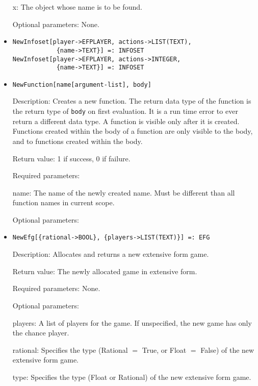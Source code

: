 \begin{itemize}
\bd
\item
[x:] The object whose name is to be found.
\ed

\item
[Optional parameters:] None.
\ed


\item
\protect \large \begin{verbatim} 
NewInfoset[player->EFPLAYER, actions->LIST(TEXT),
            {name->TEXT}] =: INFOSET
NewInfoset[player->EFPLAYER, actions->INTEGER,
            {name->TEXT}] =: INFOSET
\end{verbatim}\normalsize


\item   
\protect \large \begin{verbatim}
NewFunction[name[argument-list], body]
\end{verbatim}\normalsize

\bd
\item
[Description:] Creates a new function.  The return data type of the
function is the return type of \verb+body+ on first evaluation.  It is
a run time error to ever return a different data type.  A function is
visible only after it is created.  Functions created within the body
of a function are only visible to the body, and to functions created
within the body.
\item
[Return value:] 1 if success, 0 if failure.  
\item
[Required parameters:]
\bd
\item[name:] The name of the newly created name.  Must be different
than all function names in current scope.  
\ed
\item
[Optional parameters:]\hfil\null
\ed

\item
\protect \large \begin{verbatim} 
NewEfg[{rational->BOOL}, {players->LIST(TEXT)}] =: EFG
\end{verbatim}\normalsize

\bd
\item
[Description:] Allocates and returns a new extensive form game.
\item
[Return value:] The newly allocated game in extensive form.
\item
[Required parameters:] None.\hfil\null
\item
[Optional parameters:]\hfil\null

\bd
\item
[players:] A list of players for the game.  If
unspecified, the new game has only the chance player.
\item
[rational:] Specifies the type (Rational $=$ True, or Float $=$ False)
of the new extensive form game.
\item
[type:] Specifies the type (Float or Rational) of the new extensive
form game.
\ed
\ed


\end{itemize}

